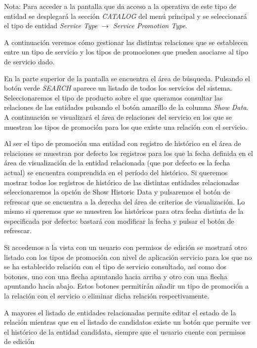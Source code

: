 Nota: Para acceder a la pantalla que da acceso a la operativa de este tipo de entidad se desplegará la sección \emph{CATALOG} del menú principal y se seleccionará el tipo de entidad \emph{Service Type} $\rightarrow$  \emph{Service Promotion Type}.


A continuación veremos cómo gestionar las distintas relaciones que se establecen entre un tipo de servicio y los tipos de promociones que pueden asociarse al tipo de servicio dado.


En la parte superior de la pantalla se encuentra el área de búsqueda. Pulsando el botón verde \emph{SEARCH} aparece un listado de todos los servicios del sistema. Seleccionaremos el tipo de producto sobre el que queramos consultar las relaciones de las entidades pulsando el botón amarillo de la columna \emph{Show Data}. A continuación se visualizará el área de relaciones del servicio en los que se muestran los tipos de promoción para los que existe una relación con el servicio.

Al ser el tipo de promoción una entidad con registro de histórico en el área de relaciones se muestran por defecto los registros para los que la fecha definida en el área de visualización de la entidad relacionada (que por defecto es la fecha actual) se encuentra comprendida en el período del histórico. Si queremos mostrar todos los registros de histórico de las distintas entidades relacionadas seleccionaremos la opción de Show Historic Data y pulsaremos el botón de refrescar que se encuentra a la derecha del área de criterios de visualización. Lo mismo si queremos que se muestren los históricos para otra fecha distinta de la especificada por defecto: bastará con modificar la fecha y pulsar el botón de refrescar.

Si accedemos a la vista con un usuario con permisos de edición se mostrará otro listado con los tipos de promoción con nivel de aplicación servicio para los que no se ha establecido relación con el tipo de servicio consultado, así como dos botones, uno con una flecha apuntando hacia arriba y otro con una flecha apuntando hacia abajo. Estos botones permitirán añadir un tipo de promoción a la relación con el servicio o eliminar dicha relación respectivamente. 

A mayores el listado de entidades relacionadas permite editar el estado de la relación mientras que en el listado de candidatos existe un botón que permite ver el histórico de la entidad candidata, siempre que el usuario cuente con permisos de edición


